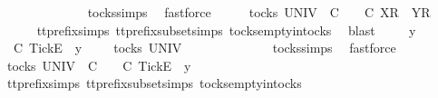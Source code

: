 \ \ \isamarkupfalse%
\ \isamarkupfalse%
\ {\isachardoublequoteopen}{\isasymrho}\ {\isacharequal}\ {\isacharbrackleft}{\isacharbrackright}{\isachardoublequoteclose}\isanewline
\ \ \ \ \isamarkupfalse%
\ tocks{\isachardot}simps\ \isamarkupfalse%
\ fastforce\isanewline
\ \ \isamarkupfalse%
\ \isamarkupfalse%
\ {\isachardoublequoteopen}{\isasymexists}{\isasymrho}{\isacharprime}{\isasymin}tocks\ UNIV{\isachardot}\ {\isasymrho}\ {\isasymlesssim}\isactrlsub C\ {\isasymrho}{\isacharprime}\ {\isasymand}\ {\isasymrho}{\isacharprime}\ {\isasymle}\isactrlsub C\ {\isacharbrackleft}X{\isacharbrackright}\isactrlsub R\ {\isacharhash}\ {\isacharbrackleft}Y{\isacharbrackright}\isactrlsub R\ {\isacharhash}\ {\isasymsigma}{\isachardoublequoteclose}\isanewline
\ \ \ \ \isamarkupfalse%
\ tt{\isacharunderscore}prefix{\isachardot}simps{\isacharparenleft}{}{\isacharparenright}\ tt{\isacharunderscore}prefix{\isacharunderscore}subset{\isachardot}simps{\isacharparenleft}{}{\isacharparenright}\ tocks{\isachardot}empty{\isacharunderscore}in{\isacharunderscore}tocks\ \isamarkupfalse%
\ blast\isanewline
{}\isamarkupfalse%
\isanewline
\ \ \isamarkupfalse%
\ {\isasymrho}\ y\ {\isasymsigma}\isanewline
\ \ \isamarkupfalse%
\ {\isachardoublequoteopen}{\isasymrho}\ {\isasymlesssim}\isactrlsub C\ {\isacharbrackleft}Tick{\isacharbrackright}\isactrlsub E\ {\isacharhash}\ y\ {\isacharhash}\ {\isasymsigma}{\isachardoublequoteclose}\ {\isachardoublequoteopen}{\isasymrho}\ {\isasymin}\ tocks\ UNIV{\isachardoublequoteclose}\isanewline
\ \ \isamarkupfalse%
\ \isamarkupfalse%
\ {\isachardoublequoteopen}{\isasymrho}\ {\isacharequal}\ {\isacharbrackleft}{\isacharbrackright}{\isachardoublequoteclose}\isanewline
\ \ \ \ \isamarkupfalse%
\ tocks{\isachardot}simps\ \isamarkupfalse%
\ fastforce\isanewline
\ \ \isamarkupfalse%
\ \isamarkupfalse%
\ {\isachardoublequoteopen}{\isasymexists}{\isasymrho}{\isacharprime}{\isasymin}tocks\ UNIV{\isachardot}\ {\isasymrho}\ {\isasymlesssim}\isactrlsub C\ {\isasymrho}{\isacharprime}\ {\isasymand}\ {\isasymrho}{\isacharprime}\ {\isasymle}\isactrlsub C\ {\isacharbrackleft}Tick{\isacharbrackright}\isactrlsub E\ {\isacharhash}\ y\ {\isacharhash}\ {\isasymsigma}{\isachardoublequoteclose}\isanewline
\ \ \ \ \isamarkupfalse%
\ tt{\isacharunderscore}prefix{\isachardot}simps{\isacharparenleft}{}{\isacharparenright}\ tt{\isacharunderscore}prefix{\isacharunderscore}subset{\isachardot}simps{\isacharparenleft}{}{\isacharparenright}\ tocks{\isachardot}empty{\isacharunderscore}in{\isacharunderscore}tocks\ \isamarkupfalse%
